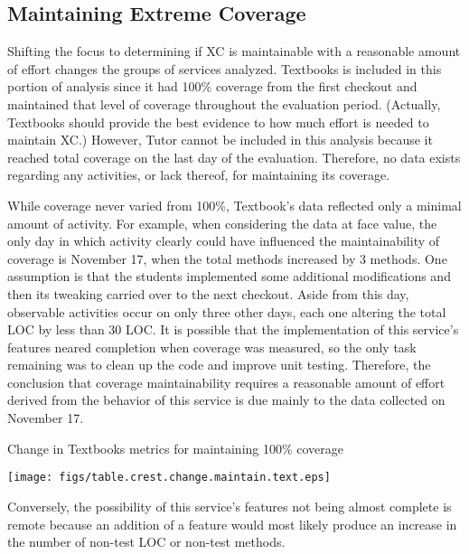 \subsection{Maintaining Extreme Coverage}
Shifting the focus to determining if XC is maintainable with a reasonable
amount of effort changes the groups of services analyzed.  Textbooks is
included in this portion of analysis since it had 100\% coverage from the
first checkout and maintained that level of coverage throughout the
evaluation period.  (Actually, Textbooks should provide the best evidence
to how much effort is needed to maintain XC.)  However, Tutor cannot be
included in this analysis because it reached total coverage on the last day
of the evaluation.  Therefore, no data exists regarding any activities, or
lack thereof, for maintaining its coverage.

While coverage never varied from 100\%, Textbook's data reflected only a
minimal amount of activity.  For example, when considering the data at face
value, the only day in which activity clearly could have influenced the
maintainability of coverage is November 17, when the total methods
increased by 3 methods.  One assumption is that the students implemented
some additional modifications and then its tweaking carried over to the
next checkout.  Aside from this day, observable activities occur on only
three other days, each one altering the total LOC by less than 30 LOC.  It
is possible that the implementation of this service's features neared
completion when coverage was measured, so the only task remaining was to
clean up the code and improve unit testing.  Therefore, the conclusion that
coverage maintainability requires a reasonable amount of effort derived
from the behavior of this service is due mainly to the data collected on
November 17.

\begin{table}[htbp]
  \begin{center}
    \caption{Change in Textbooks metrics for maintaining 100\% coverage}
    \texttt{[image: figs/table.crest.change.maintain.text.eps]}
  \end{center}
\end{table}

Conversely, the possibility of this service's features not being almost
complete is remote because an addition of a feature would most likely
produce an increase in the number of non-test LOC or non-test methods.

